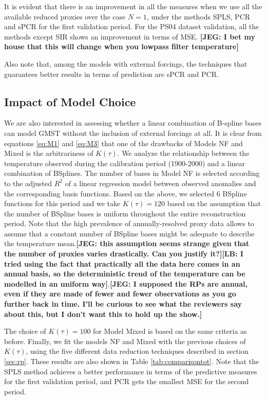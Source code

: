 \documentclass[12pt]{amsart}
\theoremstyle{plain}
\theoremstyle{definition}
\theoremstyle{remark}
\newcommand{\lb}[1]{\color{MidnightBlue}\textbf{[LB: #1]}\normalcolor}
\newcommand{\jeg}[1]{\color{ProcessBlue}\textbf{[JEG: #1]}\normalcolor}
\begin{document}
It is evident that there is an improvement in all the measures when we use all the available reduced proxies over the case
$N=1$, under the methods SPLS, PCR and sPCR for the first validation period.
For the PS04 dataset validation, all the methods except SIR shows an improvement in terms of MSE. \jeg{I bet my house that this will change when you lowpass filter temperature}

Also note that, among the models with external forcings, the techniques that
guarantees better results in terms of prediction are sPCR and PCR.

\subsection{Impact of Model Choice}
We are also interested in assessing whether a linear combination of B-spline bases can model GMST without the inclusion of external
forcings at all. It is clear from equations \eqref{eq:M1} and \eqref{eq:M3} that
one of the drawbacks of Models NF and Mixed is the arbitrariness of $K(\tau)$. We analyze the
relationship between the temperature observed during the calibration period
(1900-2000) and a linear combination of BSplines. The number of 
bases in Model NF is selected according to the adjusted $R^2$ of a linear regression model between observed anomalies and
the corresponding basis functions. Based on the above, we selected 6
BSpline functions for this period and we take $K(\tau)=120$ based on the
assumption that the number of BSpline bases is uniform
throughout the entire reconstruction period. Note that the high prevalence of
annually-resolved proxy data allows to assume that a constant number of BSpline bases might be adequate to describe the temperature
mean.\jeg{this assumption seems strange given that the number of proxies varies
  drastically. Can you justify it?}\lb{I tried using the fact that practically
  all the data here comes in an annual basis, so the deterministic trend of the 
  temperature can be
  modelled in an uniform way}.\jeg{I supposed the RPs are annual, even if they are made of fewer and fewer observations as you go further back in time. I'll be curious to see what the reviewers say about this, but I don't want this to hold up the show.}
  
  The choice of $K(\tau)=100$ for Model Mixed is
based on the same criteria as before. Finally, we fit the models NF and Mixed
with the previous choices of $K(\tau)$, using the five different data reduction
techniques described in section \ref{sec:rp}. These results are
also shown in Table \ref{tab:comparisontot}. Note that the SPLS method achieves a better performance in terms of the
predictive measures for the first validation period, and PCR gets the smallest
MSE for the second period. 
\end{document}
